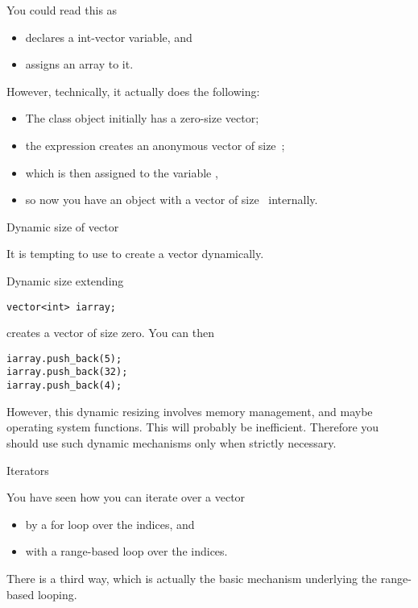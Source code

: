 You could read this as
\begin{itemize}
\item {} declares a int-vector variable, and
\item {} assigns an array to it.
\end{itemize}
However, 
technically, it actually does the following:
\begin{itemize}
\item The class object initially has a zero-size vector;
\item the expression  creates an anonymous vector
  of size~;
\item which is then assigned to the variable ,
\item so now you have an object with a vector of size~ internally.
\end{itemize}

 {Dynamic size of vector}

It is tempting to use  to create a vector dynamically.

\begin{block}{Dynamic size extending}
  \label{sl:vector-extend}
\begin{verbatim}
vector<int> iarray;
\end{verbatim}
creates a vector of size zero. You can then
\begin{verbatim}
iarray.push_back(5);
iarray.push_back(32);
iarray.push_back(4);
\end{verbatim}
\end{block}

However, this dynamic resizing involves memory management, and maybe
operating system functions. This will probably be
inefficient. Therefore you should use such dynamic mechanisms only
when strictly necessary.

 {Iterators}
\label{sec:iterator}

You have seen how you can iterate over a vector
\begin{itemize}
\item by a for loop over the indices, and
\item with a range-based loop over the indices.
\end{itemize}
There is a third way, which is actually the basic mechanism underlying
the range-based looping.

